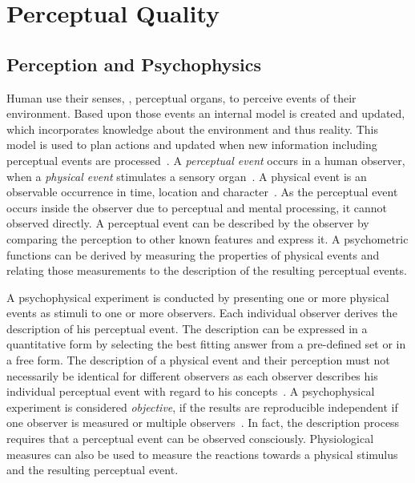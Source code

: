 \section{Perceptual Quality}
\subsection{Perception and Psychophysics}
Human use their senses, \ie, perceptual organs, to perceive events of their environment.
Based upon those events an internal model is created and updated, which incorporates knowledge about the environment and thus reality.
This model is used to plan actions and updated when new information including perceptual events are processed~\citep[p.~4]{blauert_spatial_1996}.
A \emph{perceptual event} occurs in a human observer, when a \emph{physical event} stimulates a sensory organ~\citep{blauert_spatial_1996}.
A physical event is an observable occurrence in time, location and character~\citep{callet_qualinet_2013}.
As the perceptual event occurs inside the observer due to perceptual and mental processing, it cannot observed directly.
A perceptual event can be described by the observer by comparing the perception to other known features and express it.
A psychometric functions can be derived by measuring the properties of physical events and relating those measurements to the description of the resulting perceptual events.

A psychophysical experiment is conducted by presenting one or more physical events as stimuli to one or more observers.
Each individual observer derives the description of his perceptual event.
The description can be expressed in a quantitative form by selecting the best fitting answer from a pre-defined set or in a free form.
The description of a physical event and their perception must not necessarily be identical for different observers as each observer describes his individual perceptual event with regard to his concepts~\citep[p.~11]{blauert_spatial_1996}.
A psychophysical experiment is considered \emph{objective}, if the results are reproducible independent if one observer is measured or multiple observers~\citep[p.~11]{blauert_spatial_1996}.
In fact, the description process requires that a perceptual event can be observed consciously.
Physiological measures can also be used to measure the reactions towards a physical stimulus and the resulting perceptual event.

